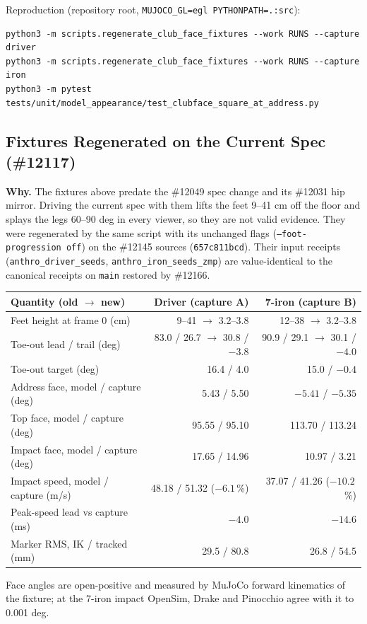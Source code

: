 \documentclass[11pt,a4paper]{article}
\begin{document}
Reproduction (repository root, \texttt{MUJOCO\_GL=egl PYTHONPATH=.:src}):
\begin{verbatim}
python3 -m scripts.regenerate_club_face_fixtures --work RUNS --capture driver
python3 -m scripts.regenerate_club_face_fixtures --work RUNS --capture iron
python3 -m pytest tests/unit/model_appearance/test_clubface_square_at_address.py
\end{verbatim}

\subsection{Fixtures Regenerated on the Current Spec (\#12117)}
\textbf{Why.} The fixtures above predate the \#12049 spec change and its
\#12031 hip mirror. Driving the current spec with them lifts the feet 9--41 cm
off the floor and splays the legs 60--90 deg in every viewer, so they are not
valid evidence. They were regenerated by the same script with its unchanged
flags (\texttt{--foot-progression off}) on the \#12145 sources
(\texttt{657c811bcd}). Their input receipts (\texttt{anthro\_driver\_seeds},
\texttt{anthro\_iron\_seeds\_zmp}) are value-identical to the canonical
receipts on \texttt{main} restored by \#12166.

\begin{center}
\begin{tabular}{@{}lrr@{}}
\toprule
Quantity (old $\rightarrow$ new) & Driver (capture A) & 7-iron (capture B) \\
\midrule
Feet height at frame 0 (cm) & 9--41 $\rightarrow$ 3.2--3.8 & 12--38 $\rightarrow$ 3.2--3.8 \\
Toe-out lead / trail (deg) & 83.0 / 26.7 $\rightarrow$ 30.8 / $-3.8$ & 90.9 / 29.1 $\rightarrow$ 30.1 / $-4.0$ \\
Toe-out target (deg) & 16.4 / 4.0 & 15.0 / $-0.4$ \\
Address face, model / capture (deg) & 5.43 / 5.50 & $-5.41$ / $-5.35$ \\
Top face, model / capture (deg) & 95.55 / 95.10 & 113.70 / 113.24 \\
Impact face, model / capture (deg) & 17.65 / 14.96 & 10.97 / 3.21 \\
Impact speed, model / capture (m/s) & 48.18 / 51.32 ($-6.1$\,\%) & 37.07 / 41.26 ($-10.2$\,\%) \\
Peak-speed lead vs capture (ms) & $-4.0$ & $-14.6$ \\
Marker RMS, IK / tracked (mm) & 29.5 / 80.8 & 26.8 / 54.5 \\
\bottomrule
\end{tabular}
\end{center}
Face angles are open-positive and measured by MuJoCo forward kinematics of the
fixture; at the 7-iron impact OpenSim, Drake and Pinocchio agree with it to
0.001 deg.
\end{document}
